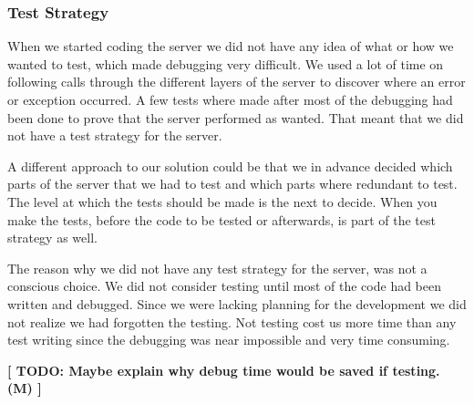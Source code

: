 \subsubsection{Test Strategy}
When we started coding the server we did not have any idea of what or how we wanted to test, which made debugging very difficult. We used a lot of time on following calls through the different layers of the server to discover where an error or exception occurred. A few tests where made after most of the debugging had been done to prove that the server performed as wanted. That meant that we did not have a test strategy for the server.

A different approach to our solution could be that we in advance decided which parts of the server that we had to test and which parts where redundant to test. The level at which the tests should be made is the next to decide. When you make the tests, before the code to be tested or afterwards, is part of the test strategy as well.

The reason why we did not have any test strategy for the server, was not a conscious choice. We did not consider testing until most of the code had been written and debugged. Since we were lacking planning for the development we did not realize we had forgotten the testing. Not testing cost us more time than any test writing since the debugging was near impossible and very time consuming.

\textbf{[ TODO: Maybe explain why debug time would be saved if testing. (M) ]}